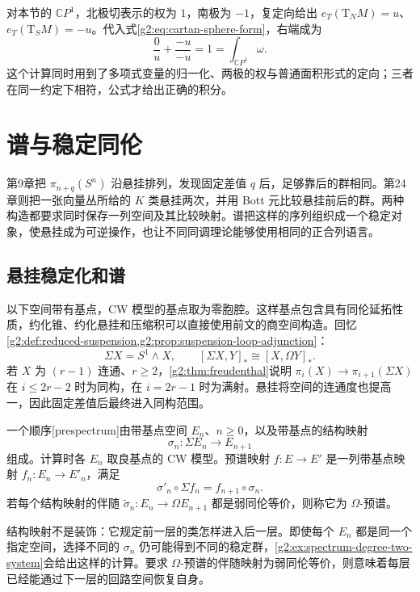 \ProseParagraphBreak
对本节的 \(\mathbb CP^1\)，北极切表示的权为 \(1\)，南极为 \(-1\)，复定向给出 \(e_T(\mathrm T_NM)=u\)、\(e_T(\mathrm T_SM)=-u\)。代入式\eqref{g2:eq:cartan-sphere-form}，右端成为
\[
	\frac{0}{u}+\frac{-u}{-u}=1=\int_{\mathbb CP^1}\omega.
\]
这个计算同时用到了多项式变量的归一化、两极的权与普通面积形式的定向；三者在同一约定下相符，公式才给出正确的积分。

\section{谱与稳定同伦}
\label{g2:sec:C02}

第9章把 \(\pi_{n+q}(S^n)\) 沿悬挂排列，发现固定差值 \(q\) 后，足够靠后的群相同。第24章则把一张向量丛所给的 \(K\) 类悬挂两次，并用 Bott 元比较悬挂前后的群。两种构造都要求同时保存一列空间及其比较映射。谱把这样的序列组织成一个稳定对象，使悬挂成为可逆操作，也让不同同调理论能够使用相同的正合列语言。

\subsection{悬挂稳定化和谱}
\label{g2:subsec:C02:01}

以下空间带有基点，CW 模型的基点取为零胞腔。这样基点包含具有同伦延拓性质，约化锥、约化悬挂和压缩积可以直接使用前文的商空间构造。回忆\cref{g2:def:reduced-suspension,g2:prop:suspension-loop-adjunction}：
\[
	\Sigma X=S^1\wedge X,\qquad
	[\Sigma X,Y]_*\cong[X,\Omega Y]_*.
\]
若 \(X\) 为 \((r-1)\) 连通、\(r\ge2\)，\cref{g2:thm:freudenthal}说明 \(\pi_i(X)\to\pi_{i+1}(\Sigma X)\) 在 \(i\le2r-2\) 时为同构，在 \(i=2r-1\) 时为满射。悬挂将空间的连通度也提高一，因此固定差值后最终进入同构范围。

\begin{definition}\label{g2:def:sequential-prespectrum}
	一个顺序[prespectrum]由带基点空间 \(E_n\)、\(n\ge0\)，以及带基点的结构映射
	\[
		\sigma_n:\Sigma E_n\longrightarrow E_{n+1}
	\]
	组成。计算时各 \(E_n\) 取良基点的 CW 模型。预谱映射 \(f:E\to E'\) 是一列带基点映射 \(f_n:E_n\to E'_n\)，满足
	\[
		\sigma'_n\circ\Sigma f_n=f_{n+1}\circ\sigma_n.
	\]
	若每个结构映射的伴随 \(\widetilde\sigma_n:E_n\to\Omega E_{n+1}\) 都是弱同伦等价，则称它为 \(\Omega\)-预谱。
\end{definition}

结构映射不是装饰：它规定前一层的类怎样进入后一层。即使每个 \(E_n\) 都是同一个指定空间，选择不同的 \(\sigma_n\) 仍可能得到不同的稳定群，\cref{g2:ex:spectrum-degree-two-system}会给出这样的计算。要求 \(\Omega\)-预谱的伴随映射为弱同伦等价，则意味着每层已经能通过下一层的回路空间恢复自身。

